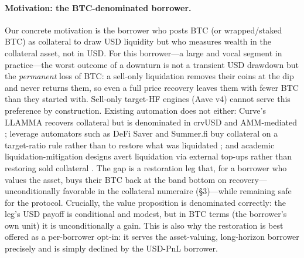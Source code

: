 \documentclass[12pt]{article}
\begin{document}
\paragraph{Motivation: the BTC-denominated borrower.} Our concrete motivation is the borrower who posts BTC (or wrapped/staked BTC) as collateral to draw USD liquidity but who measures wealth in the collateral asset, not in USD. For this borrower---a large and vocal segment in practice---the worst outcome of a downturn is not a transient USD drawdown but the \emph{permanent} loss of BTC: a sell-only liquidation removes their coins at the dip and never returns them, so even a full price recovery leaves them with fewer BTC than they started with. Sell-only target-HF engines (Aave v4) cannot serve this preference by construction. Existing automation does not either: Curve's LLAMMA recovers collateral but is denominated in crvUSD and AMM-mediated \cite{curve-llamma}; leverage automators such as DeFi Saver and Summer.fi buy collateral on a target-ratio rule rather than to restore what was liquidated \cite{defisaver-automation,summerfi-autobuy}; and academic liquidation-mitigation designs avert liquidation via external top-ups rather than restoring sold collateral \cite{mahmood2023miqado}. The gap is a restoration leg that, for a borrower who values the asset, buys their BTC back at the band bottom on recovery---unconditionally favorable in the collateral numeraire (\S3)---while remaining safe for the protocol. Crucially, the value proposition is denominated correctly: the leg's USD payoff is conditional and modest, but in BTC terms (the borrower's own unit) it is unconditionally a gain. This is also why the restoration is best offered as a per-borrower opt-in: it serves the asset-valuing, long-horizon borrower precisely and is simply declined by the USD-PnL borrower.
\end{document}
